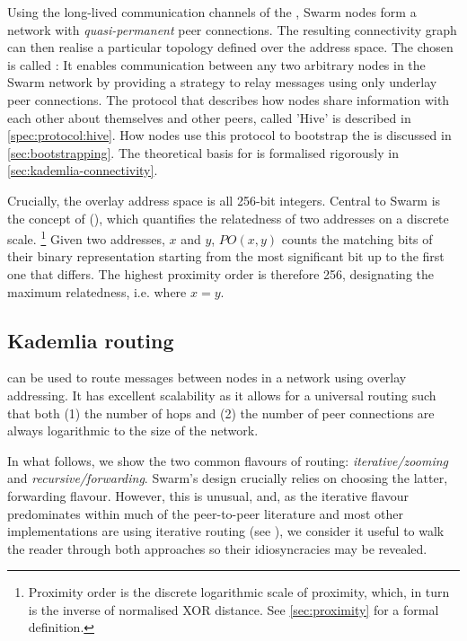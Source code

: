 Using the long-lived communication channels of the , Swarm nodes form a network with \emph{quasi-permanent} peer connections. The resulting connectivity graph can then realise a particular topology defined over the address space. The  chosen is called : It enables communication between any two arbitrary nodes in the Swarm network by providing a strategy to relay messages using only underlay peer connections. The protocol that describes how nodes share information with each other about themselves and other peers, called 'Hive' is described in \ref{spec:protocol:hive}. How nodes use this protocol to bootstrap the  is discussed in \ref{sec:bootstrapping}. The  theoretical basis for  is formalised rigorously in \ref{sec:kademlia-connectivity}. 

Crucially, the overlay address space is all 256-bit integers. Central to Swarm is the concept of  (), which quantifies the relatedness of two addresses on a discrete scale.%
%
\footnote{Proximity order is the discrete logarithmic scale of proximity, which, in turn is the inverse of normalised XOR distance. See \ref{sec:proximity} for a formal definition.}
%
Given two addresses, $x$ and $y$, $\mathit{PO}(x,y)$ counts the matching bits of their binary representation starting from the most significant bit up to the first one that differs. The highest proximity order is therefore 256, designating the maximum relatedness, i.e. where $x=y$.

\subsection{Kademlia routing \statusgreen}\label{sec:kademlia-routing}

 can be used to route messages between nodes in a network using overlay addressing. It has excellent scalability as it allows for a universal routing such that both (1) the number of hops and (2) the number of peer connections are always logarithmic to the size of the network. 

In what follows, we show the two common flavours of routing: \emph{iterative/zooming} and \emph{recursive/forwarding}. Swarm's design crucially relies on choosing the latter, forwarding flavour. However, this is unusual, and, as the iterative flavour predominates within much of the peer-to-peer literature and most other implementations are using iterative routing  (see \cite{maymounkov2002kademlia,baumgart2007s,lua2005survey}), we consider it useful to walk the reader through both approaches so their idiosyncracies may be revealed.

